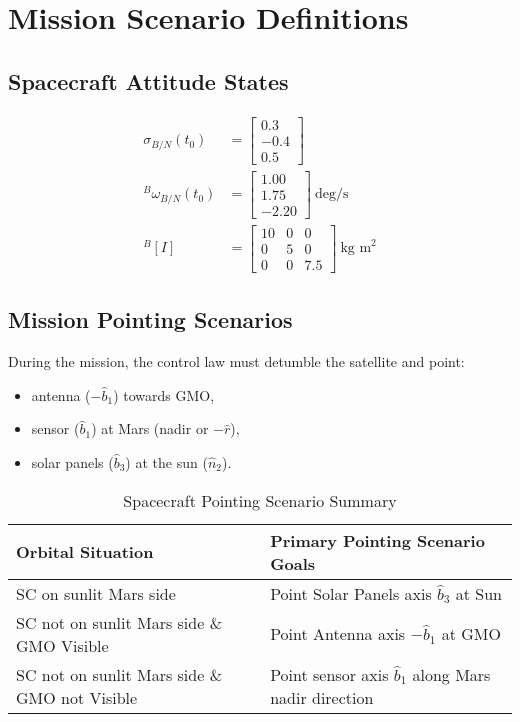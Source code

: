 \documentclass[12pt]{article}
\begin{document}
\section{Mission Scenario Definitions}
\subsection{Spacecraft Attitude States}
\begin{align}
\sigma_{B/N}(t_0) &= \begin{bmatrix} 0.3 \\ -0.4 \\ 0.5 \end{bmatrix} \\
{}^B\omega_{B/N}(t_0) &= \begin{bmatrix} 1.00 \\ 1.75 \\ -2.20 \end{bmatrix}~\text{deg/s} \\
{}^B[I] &= \begin{bmatrix} 10 & 0 & 0 \\ 0 & 5 & 0 \\ 0 & 0 & 7.5 \end{bmatrix}~\text{kg m}^2
\end{align}

\subsection{Mission Pointing Scenarios}
During the mission, the control law must detumble the satellite and point:
\begin{itemize}
  \item antenna (\(-\hat{b}_1\)) towards GMO,
  \item sensor (\(\hat{b}_1\)) at Mars (nadir or \(-\hat{r}\)),
  \item solar panels (\(\hat{b}_3\)) at the sun (\(\hat{n}_2\)).
\end{itemize}

\begin{table}[h!]
\centering
\caption{Spacecraft Pointing Scenario Summary}
\begin{tabular}{@{}ll@{}}
\toprule
Orbital Situation & Primary Pointing Scenario Goals \\
\midrule
SC on sunlit Mars side & Point Solar Panels axis $\hat{b}_3$ at Sun \\
SC not on sunlit Mars side \& GMO Visible & Point Antenna axis $-\hat{b}_1$ at GMO \\
SC not on sunlit Mars side \& GMO not Visible & Point sensor axis $\hat{b}_1$ along Mars nadir direction \\
\bottomrule
\end{tabular}
\end{table}
\end{document}
